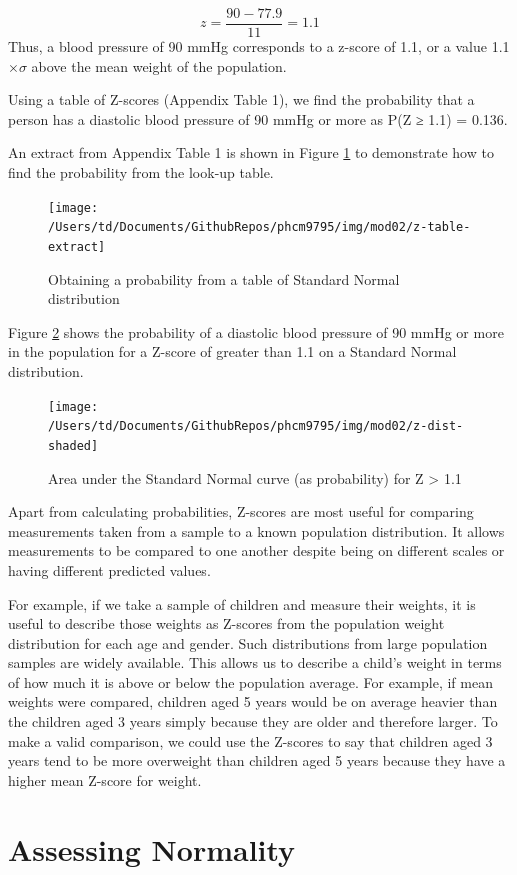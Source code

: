 \documentclass[
]{memoir}
\begin{document}
\[ z = \frac{90 - 77.9}{11} = 1.1 \]
Thus, a blood pressure of 90 mmHg corresponds to a z-score of 1.1, or a value 1.1 \(\times \sigma\) above the mean weight of the population.

Using a table of Z-scores (Appendix Table 1), we find the probability that a person has a diastolic blood pressure of 90 mmHg or more as P(Z ≥ 1.1) = 0.136.

An extract from Appendix Table 1 is shown in Figure \ref{fig:fig-2-4} to demonstrate how to find the probability from the look-up table.

\begin{figure}
\texttt{[image: /Users/td/Documents/GithubRepos/phcm9795/img/mod02/z-table-extract]} \caption{Obtaining a probability from a table of Standard Normal distribution}\label{fig:fig-2-4}
\end{figure}

Figure \ref{fig:fig-2-5} shows the probability of a diastolic blood pressure of 90 mmHg or more in the population for a Z-score of greater than 1.1 on a Standard Normal distribution.

\begin{figure}
\texttt{[image: /Users/td/Documents/GithubRepos/phcm9795/img/mod02/z-dist-shaded]} \caption{Area under the Standard Normal curve (as probability) for Z > 1.1}\label{fig:fig-2-5}
\end{figure}

Apart from calculating probabilities, Z-scores are most useful for comparing measurements taken from a sample to a known population distribution. It allows measurements to be compared to one another despite being on different scales or having different predicted values.

For example, if we take a sample of children and measure their weights, it is useful to describe those weights as Z-scores from the population weight distribution for each age and gender. Such distributions from large population samples are widely available. This allows us to describe a child's weight in terms of how much it is above or below the population average. For example, if mean weights were compared, children aged 5 years would be on average heavier than the children aged 3 years simply because they are older and therefore larger. To make a valid comparison, we could use the Z-scores to say that children aged 3 years tend to be more overweight than children aged 5 years because they have a higher mean Z-score for weight.

\hypertarget{assessing-normality}{%
\section{Assessing Normality}\label{assessing-normality}}
\end{document}
